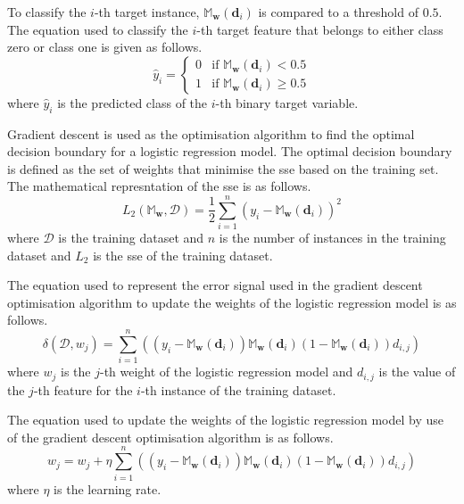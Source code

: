 \documentclass[10pt, conference]{IEEEtran}
\begin{document}
To classify the $i$-th target instance, $\mathbb{M}_{\textbf{w}}(\textbf{d}_i)$ is compared to a threshold of $0.5$. The equation used
to classify the $i$-th target feature that belongs to either class zero or class one is given as follows.
\begin{equation}
    \hat{y}_i = 
    \begin{cases}
    0 & \text{if } \mathbb{M}_{\textbf{w}}(\textbf{d}_i) < 0.5 \\
    1 & \text{if } \mathbb{M}_{\textbf{w}}(\textbf{d}_i) \geq 0.5 
    \end{cases}
    \label{eq: classify_target_instance}
\end{equation}
where $\hat{y}_i$ is the predicted class of the $i$-th binary target variable.

Gradient descent is used as the optimisation algorithm to find the optimal decision boundary for a logistic regression model.
The optimal decision boundary is defined as the set of weights that minimise the \acrfull{sse} based on the training set.
The mathematical represntation of the \acrshort{sse} is as follows.
\begin{equation}
    L_2\left(\mathbb{M}_{\textbf{w}}, \mathcal{D}\right) = \frac{1}{2} \sum_{i=1}^{n} \left( y_i - \mathbb{M}_{\textbf{w}}(\textbf{d}_i) \right)^2 \label{eq: sse_function}
\end{equation}
where $\mathcal{D}$ is the training dataset and $n$ is the number of instances in the training dataset and $L_2$ is the
\acrshort{sse} of the training dataset.

The equation used to represent the error signal used in the gradient descent optimisation algorithm to update the weights
of the logistic regression model is as follows.
\begin{equation}
    \delta(\mathcal{D}, w_j) = \sum_{i=1}^{n} \left((y_i - \mathbb{M}_{\textbf{w}}(\textbf{d}_i)) \mathbb{M}_{\textbf{w}}(\textbf{d}_i)
                                    (1-\mathbb{M}_{\textbf{w}}(\textbf{d}_i)) d_{i,j}\right) \label{eq: error_signal}
\end{equation}
where $w_j$ is the $j$-th weight of the logistic regression model and $d_{i,j}$ is the value of the $j$-th
feature for the $i$-th instance of the training dataset.

The equation used to update the weights of the logistic regression model by use of the gradient descent optimisation algorithm
is as follows.
\begin{equation}
    w_j = w_j + \eta \sum_{i=1}^{n} \left((y_i - \mathbb{M}_{\textbf{w}}(\textbf{d}_i)) \mathbb{M}_{\textbf{w}}(\textbf{d}_i)
                            (1-\mathbb{M}_{\textbf{w}}(\textbf{d}_i)) d_{i,j}\right) \label{eq: weight_update}
\end{equation}
where $\eta$ is the learning rate.
\end{document}
